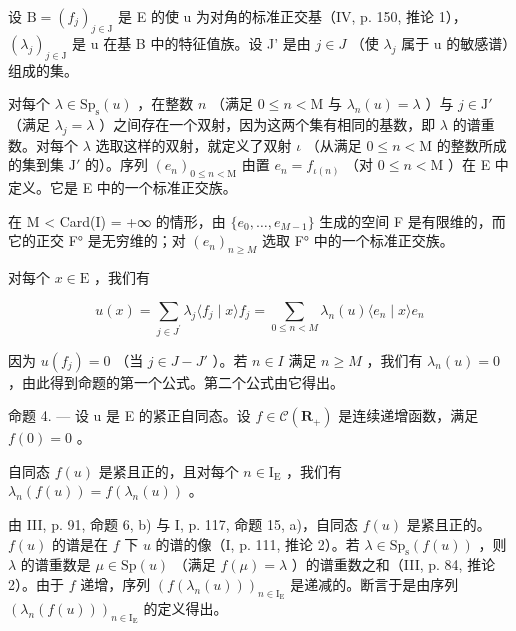 设 \(\mathrm{B} = (f_{j})_{j \in \mathrm{J}}\) 是 E 的使 u 为对角的标准正交基（IV, p. 150, 推论 1），\((\lambda_{j})_{j \in \mathrm{J}}\) 是 u 在基 B 中的特征值族。设 J' 是由 \(j \in J\) （使 \(\lambda_{j}\) 属于 u 的敏感谱）组成的集。

对每个 \(\lambda \in \mathrm{Sp}_{\mathrm{s}}(u)\) ，在整数 \(n\) （满足 \(0 \leqslant n < \mathrm{M}\) 与 \(\lambda_{n}(u) = \lambda\) ）与 \(j \in \mathrm{J}'\) （满足 \(\lambda_{j} = \lambda\) ）之间存在一个双射，因为这两个集有相同的基数，即 \(\lambda\) 的谱重数。对每个 \(\lambda\) 选取这样的双射，就定义了双射 \(\iota\) （从满足 \(0 \leqslant n < \mathrm{M}\) 的整数所成的集到集 \(\mathrm{J}'\) 的）。序列 \((e_n)_{0 \leqslant n < \mathrm{M}}\) 由置 \(e_n = f_{\iota(n)}\) （对 \(0 \leqslant n < \mathrm{M}\) ）在 E 中定义。它是 E 中的一个标准正交族。

在 M \textless{} Card(I) = +∞ 的情形，由 \(\{e_{0},\ldots,e_{M-1}\}\) 生成的空间 F 是有限维的，而它的正交 F° 是无穷维的；对 \((e_{n})_{n\geqslant M}\) 选取 F° 中的一个标准正交族。

对每个 \(x \in \mathrm{E}\) ，我们有

\[
u (x) = \sum_ {j \in J ^ {\prime}} \lambda_ {j} \langle f _ {j} \mid x \rangle f _ {j} = \sum_ {0 \leqslant n <   M} \lambda_ {n} (u) \langle e _ {n} \mid x \rangle e _ {n}
\]

因为 \(u(f_{j}) = 0\) （当 \(j \in J - J'\) ）。若 \(n \in I\) 满足 \(n \geqslant M\) ，我们有 \(\lambda_{n}(u) = 0\) ，由此得到命题的第一个公式。第二个公式由它得出。

命题 4. --- 设 u 是 E 的紧正自同态。设 \(f \in \mathcal{C}(\mathbf{R}_{+})\) 是连续递增函数，满足 \(f(0) = 0\) 。

自同态 \(f(u)\) 是紧且正的，且对每个 \(n \in \mathrm{I}_{\mathrm{E}}\) ，我们有 \(\lambda_n(f(u)) = f(\lambda_n(u))\) 。

由 III, p. 91, 命题 6, b) 与 I, p. 117, 命题 15, a)，自同态 \(f(u)\) 是紧且正的。\(f(u)\) 的谱是在 \(f\) 下 \(u\) 的谱的像（I, p. 111, 推论 2）。若 \(\lambda \in \mathrm{Sp}_{\mathrm{s}}(f(u))\) ，则 \(\lambda\) 的谱重数是 \(\mu \in \mathrm{Sp}(u)\) （满足 \(f(\mu) = \lambda\) ）的谱重数之和（III, p. 84, 推论 2）。由于 \(f\) 递增，序列 \((f(\lambda_n(u)))_{n \in \mathrm{I_E}}\) 是递减的。断言于是由序列 \((\lambda_n(f(u)))_{n \in \mathrm{I_E}}\) 的定义得出。

